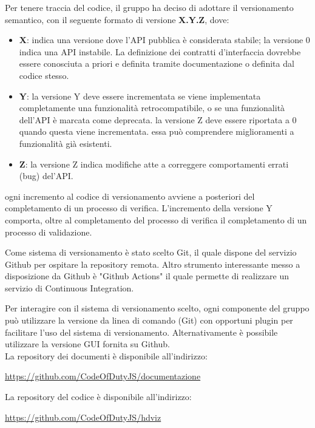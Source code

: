 			Per tenere traccia del codice, il gruppo ha deciso di adottare il versionamento semantico, con il seguente formato di versione \textbf{X.Y.Z}, dove:
			\begin{itemize}
			    \item \textbf{X}: indica una versione dove l'API pubblica è considerata stabile; la versione 0 indica una API instabile. La definizione dei contratti d'interfaccia dovrebbe essere conosciuta a priori e definita tramite documentazione o definita dal codice stesso.
			    \item \textbf{Y}: la versione Y deve essere incrementata se viene implementata completamente una funzionalità retrocompatibile, o se una funzionalità dell'API è marcata come deprecata. la versione Z deve essere riportata a 0 quando questa viene incrementata. essa può comprendere miglioramenti a funzionalità già esistenti.
			    \item \textbf{Z}: la versione Z indica modifiche atte a correggere comportamenti errati (bug) del'API.  
			\end{itemize}
			
			ogni incremento al codice di versionamento avviene a posteriori del completamento di un processo di verifica. L'incremento della versione Y comporta, oltre al completamento del processo di verifica il completamento di un processo di validazione.  
			
			Come sistema di versionamento è stato scelto Git, il quale dispone del servizio Github per ospitare la repository remota. Altro strumento interessante messo a disposizione da Github è "Github Actions" il quale permette di realizzare un servizio di Continuous Integration.
			
			Per interagire con il sistema di versionamento scelto, ogni componente del gruppo può utilizzare la versione da linea di comando (Git) con opportuni plugin per facilitare l'uso del sistema di versionamento. Alternativamente è possibile utilizzare la versione GUI fornita su Github.\\
			La repository dei documenti è disponibile all'indirizzo:\\
			\begin{center}
				\url{https://github.com/CodeOfDutyJS/documentazione}
			\end{center}
			La repository del codice è disponibile all'indirizzo:\\
			\begin{center}
				\url{https://github.com/CodeOfDutyJS/hdviz}
			\end{center}
			
